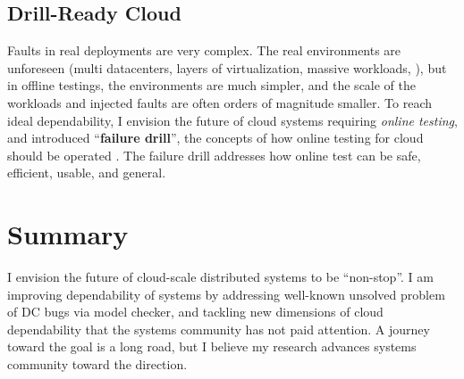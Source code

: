 \documentclass[11pt]{article}
\begin{document}
\subsection{Drill-Ready Cloud} 

Faults in real deployments are very complex. The real environments are
unforeseen (multi datacenters, layers of virtualization, massive
workloads, \etc), but in offline testings, the environments are much simpler, and
the scale of the workloads and injected faults are often orders of magnitude
smaller. To reach ideal dependability, I envision the future of cloud systems requiring
\textit{online testing}, and introduced ``\textbf{failure drill}'', the concepts of
how online testing for cloud should be operated
\cite{Leesatapornwongsa+14-Drill-fixed}.  The failure drill addresses how online
test can be safe, efficient, usable, and general.

\section{Summary}

I envision the future of cloud-scale distributed systems to be ``non-stop''. I
am improving dependability of systems by addressing well-known unsolved problem
of DC bugs via model checker, and tackling new dimensions of cloud dependability 
that the systems community has not paid attention. A journey
toward the goal is a long road, but I believe my research advances systems
community toward the direction. 


\end{document}
